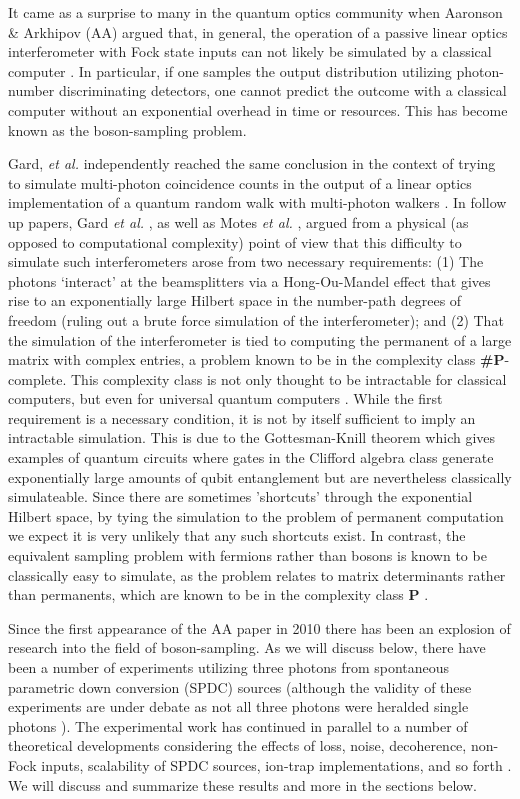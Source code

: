 \documentclass[aps,pra,twocolumn,amsmath,amssymb,nofootinbib,superscriptaddress]{revtex4}
\begin{document}
It came as a surprise to many in the quantum optics community when Aaronson \& Arkhipov (AA) argued that, in general, the operation of a passive linear optics interferometer with Fock state inputs can not likely be simulated by a classical computer \cite{aar}. In particular, if one samples the output distribution utilizing photon-number discriminating detectors, one cannot predict the outcome with a classical computer without an exponential overhead in time or resources. This has become known as the boson-sampling problem. 

Gard, \emph{et al.} independently reached the same conclusion in the context of trying to simulate multi-photon coincidence counts in the output of a linear optics implementation of a quantum random walk with multi-photon walkers \cite{gard2}. In follow up papers, Gard \emph{et al.} \cite{gard}, as well as Motes \emph{et al.} \cite{motes}, argued from a physical (as opposed to computational complexity) point of view that this difficulty to simulate such interferometers arose from two necessary requirements: (1) The photons `interact' at the beamsplitters via a Hong-Ou-Mandel effect that gives rise to an exponentially large Hilbert space in the number-path degrees of freedom (ruling out a brute force simulation of the interferometer); and (2) That the simulation of the interferometer is tied to computing the permanent of a large matrix with complex entries, a problem known to be in the complexity class \textbf{\#P}-complete.  This complexity class is not only thought to be intractable for classical computers, but even for universal quantum computers \cite{bib:Ryser63}. While the first requirement is a necessary condition, it is not by itself sufficient to imply an intractable simulation.  This is due to the Gottesman-Knill theorem which gives examples of quantum circuits where gates in the Clifford algebra class generate exponentially large amounts of qubit entanglement but are nevertheless classically simulateable. Since there are sometimes 'shortcuts' through the exponential Hilbert space, by tying the simulation to the problem of permanent computation we expect it is very unlikely that any such shortcuts exist. In contrast, the equivalent sampling problem with fermions rather than bosons is known to be classically easy to simulate, as the problem relates to matrix determinants rather than permanents, which are known to be in the complexity class \textbf{P} \cite{gard}.

Since the first appearance of the AA paper in 2010 there has been an explosion of research into the field of boson-sampling. As we will discuss below, there have been a number of experiments utilizing three photons from spontaneous parametric down conversion (SPDC) sources \cite{ralph,broome,spring,anon,till,crespi} (although the validity of these experiments are under debate as not all three photons were heralded single photons \cite{bib:dowlingSchmampling}). The experimental work has continued in parallel to a number of theoretical developments considering the effects of loss, noise, decoherence, non-Fock inputs, scalability of SPDC sources, ion-trap implementations, and so forth \cite{rohde1,rohde2,jiang,motes,shch}. We will discuss and summarize these results and more in the sections below. 
\end{document}

